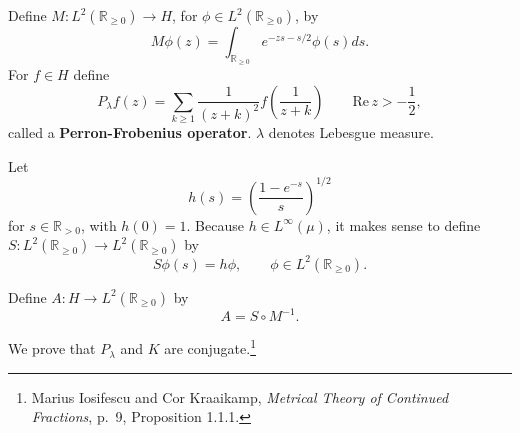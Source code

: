 \documentclass{article}
\def\Re{\ensuremath{\mathrm{Re}}\,}
\theoremstyle{definition}
\begin{document}
Define $M:L^2(\mathbb{R}_{\geq 0}) \to H$, for $\phi \in L^2(\mathbb{R}_{\geq 0})$, by
\[
M\phi(z) = \int_{\mathbb{R}_{\geq 0}} e^{-zs -s/2} \phi(s) ds.
\]
For $f \in H$ define
\[
P_\lambda f(z) = \sum_{k \geq 1} \frac{1}{(z+k)^2} f \left( \frac{1}{z+k} \right)\qquad \Re z > -\frac{1}{2},
\]
called a \textbf{Perron-Frobenius operator}.
$\lambda$ denotes Lebesgue measure. 


Let 
\[
h(s)=\left(\frac{1-e^{-s}}{s} \right)^{1/2}
\]
for $s \in \mathbb{R}_{>0}$, with
$h(0)=1$.
 Because $h \in L^\infty(\mu)$, it makes sense to define
 $S:L^2(\mathbb{R}_{\geq 0}) \to L^2(\mathbb{R}_{\geq 0})$ by
\[
S \phi(s) = h \phi,\qquad \phi \in L^2(\mathbb{R}_{\geq 0}).
\]

Define $A:H \to L^2(\mathbb{R}_{\geq 0})$ by 
\[
A = S \circ M^{-1}.
\]


We prove that $P_\lambda$ and $K$ are conjugate.\footnote{Marius Iosifescu and Cor Kraaikamp,
{\em Metrical Theory of Continued Fractions}, p.~9, Proposition 1.1.1.}
\end{document}
